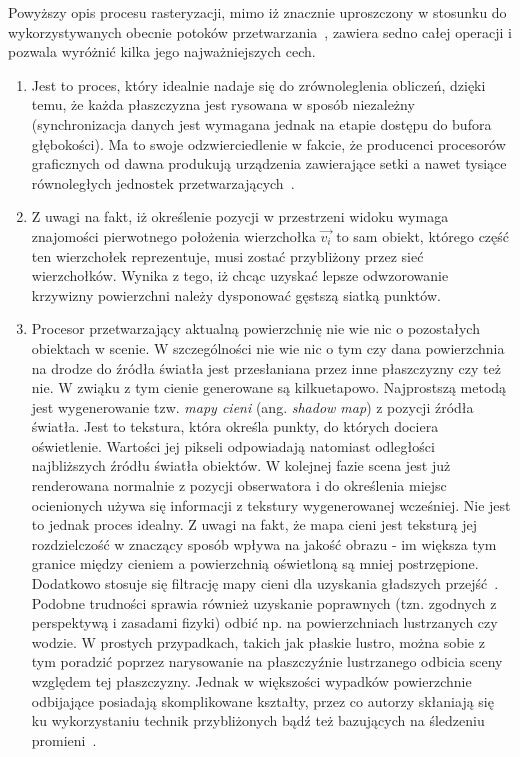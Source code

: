 Powyższy opis procesu rasteryzacji, mimo iż znacznie uproszczony w stosunku do wykorzystywanych obecnie potoków przetwarzania~\cite{OPENGL_SUPERBIBLE}, zawiera sedno całej operacji i pozwala wyróżnić kilka jego najważniejszych cech.
\begin{enumerate}
\item Jest to proces, który idealnie nadaje się do zrównoleglenia obliczeń, dzięki temu, że każda płaszczyzna jest rysowana w sposób niezależny (synchronizacja danych jest wymagana jednak na etapie dostępu do bufora głębokości). Ma to swoje odzwierciedlenie w fakcie, że producenci procesorów graficznych od dawna produkują urządzenia zawierające setki a nawet tysiące równoległych jednostek przetwarzających~\cite{NV_Hardware}\cite{AMD_Hardware}.
\item Z uwagi na fakt, iż określenie pozycji w przestrzeni widoku wymaga znajomości pierwotnego położenia wierzchołka $\vec{v_i}$ to sam obiekt, którego część ten wierzchołek reprezentuje, musi zostać przybliżony przez sieć wierzchołków. Wynika z tego, iż chcąc uzyskać lepsze odwzorowanie krzywizny powierzchni należy dysponować gęstszą siatką punktów.
\item Procesor przetwarzający aktualną powierzchnię nie wie nic o pozostałych obiektach w scenie. W szczególności nie wie nic o tym czy dana powierzchnia na drodze do źródła światła jest przesłaniana przez inne płaszczyzny czy też nie. W zwiąku z tym cienie generowane są kilkuetapowo. Najprostszą metodą jest wygenerowanie tzw. \textit{mapy cieni} (ang. \textit{shadow map}) z pozycji źródła światła. Jest to tekstura, która określa punkty, do których dociera oświetlenie. Wartości jej pikseli odpowiadają natomiast odległości najbliższych źródłu światła obiektów. W kolejnej fazie scena jest już renderowana normalnie z pozycji obserwatora i do określenia miejsc ocienionych używa się informacji z tekstury wygenerowanej wcześniej. Nie jest to jednak proces idealny. Z uwagi na fakt, że mapa cieni jest teksturą jej rozdzielczość w znaczący sposób wpływa na jakość obrazu - im większa tym granice między cieniem a powierzchnią oświetloną są mniej postrzępione. Dodatkowo stosuje się filtrację mapy cieni dla uzyskania gładszych przejść~\cite{GPU_GEMS3_PCF}. Podobne trudności sprawia również uzyskanie poprawnych (tzn. zgodnych z perspektywą i zasadami fizyki) odbić np. na powierzchniach lustrzanych czy wodzie. W prostych przypadkach, takich jak płaskie lustro, można sobie z tym poradzić poprzez narysowanie na płaszczyźnie lustrzanego odbicia sceny względem tej płaszczyzny. Jednak w większości wypadków powierzchnie odbijające posiadają skomplikowane kształty, przez co autorzy skłaniają się ku wykorzystaniu technik przybliżonych bądź też bazujących na śledzeniu promieni~\cite{GPU_GEMS3_MIRRORS}.
\end{enumerate}
